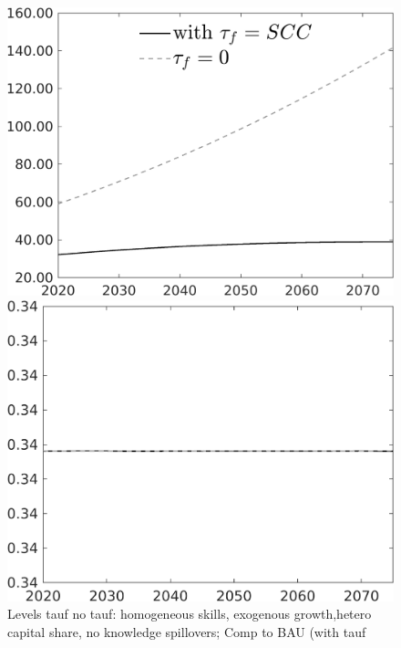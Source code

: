 \documentclass[12pt]{article}
\begin{document}
\begin{figure}[h!!]
	\centering
	\caption{Levels tauf no tauf: homogeneous skills, exogenous growth,hetero capital share, no knowledge spillovers; Comp to BAU (with tauf}\label{fig:Leveltauf_nsk1_xgr1_noknow_withtaul}
	\begin{minipage}[]{0.32\textwidth}
		\includegraphics[width=1\textwidth]{../../codding_model/own_basedOnFried/optimalPol_010922_revision/figures/all_13Sept22/LevTaufNoTauf_TaulCalib_regime0_Emnet_spillover0_nsk1_xgr1_knspil1_sep1_LFlimit0_emsbase0_countec0_GovRev0_etaa0.79_lgd1.png}
	\end{minipage}	
	\begin{minipage}[]{0.32\textwidth}
		\includegraphics[width=1\textwidth]{../../codding_model/own_basedOnFried/optimalPol_010922_revision/figures/all_13Sept22/LevTaufNoTauf_TaulCalib_regime0_hh_spillover0_nsk1_xgr1_knspil1_sep1_LFlimit0_emsbase0_countec0_GovRev0_etaa0.79_lgd0.png}

\end{minipage}
\end{figure}
\end{document}
